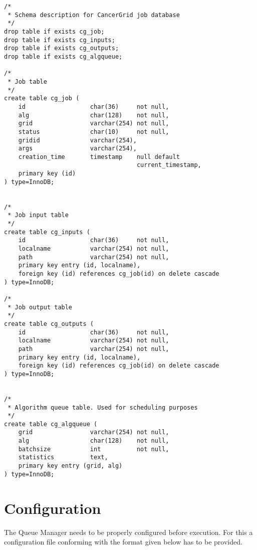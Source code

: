 \documentclass[a4paper, 12pt]{article}
\begin{document}
\begin{verbatim}
/*
 * Schema description for CancerGrid job database
 */
drop table if exists cg_job;
drop table if exists cg_inputs;
drop table if exists cg_outputs;
drop table if exists cg_algqueue;

/*
 * Job table
 */
create table cg_job (
    id                  char(36)     not null,
    alg                 char(128)    not null,
    grid                varchar(254) not null,
    status              char(10)     not null,
    gridid              varchar(254),
    args                varchar(254),
    creation_time       timestamp    null default 
                                     current_timestamp,
    primary key (id)
) type=InnoDB;


/*
 * Job input table
 */
create table cg_inputs (
    id                  char(36)     not null,
    localname           varchar(254) not null,
    path                varchar(254) not null,
    primary key entry (id, localname),
    foreign key (id) references cg_job(id) on delete cascade
) type=InnoDB;

/*
 * Job output table
 */
create table cg_outputs (
    id                  char(36)     not null,
    localname           varchar(254) not null,
    path                varchar(254) not null,
    primary key entry (id, localname),
    foreign key (id) references cg_job(id) on delete cascade
) type=InnoDB;


/*
 * Algorithm queue table. Used for scheduling purposes
 */
create table cg_algqueue (
    grid                varchar(254) not null,
    alg                 char(128)    not null,
    batchsize           int          not null,
    statistics          text,
    primary key entry (grid, alg)
) type=InnoDB;
\end{verbatim}

\section{Configuration}

The Queue Manager needs to be properly configured before execution. For this a configuration file conforming with the format given below has to be provided. 
\end{document}
